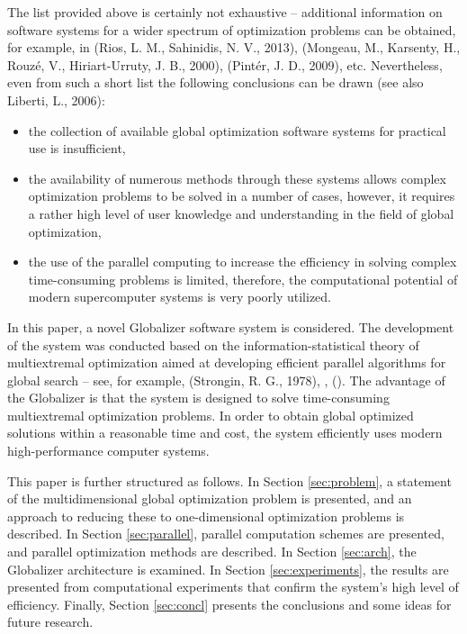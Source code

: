 \documentclass{gOMS2e}
\theoremstyle{plain}%
\theoremstyle{definition}
\theoremstyle{remark}
\begin{document}
\par
The list provided above is certainly not exhaustive – additional information on software
systems for a wider spectrum of optimization problems can be obtained, for example,
in (Rios, L. M., Sahinidis, N. V., 2013), (Mongeau, M.,  Karsenty, H., Rouzé, V., Hiriart-Urruty, J. B., 2000), (Pintér, J. D., 2009), etc.
Nevertheless, even from such a short list the following conclusions can be drawn (see also Liberti, L., 2006):
\begin{itemize}
\item  the collection of available global optimization software systems for practical use is insufficient,
\item the availability of numerous methods through these systems allows complex
optimization problems to be solved in a number of cases, however, it requires a rather
high level of user knowledge and understanding in the field of global optimization,
\item the use of the parallel computing to increase the efficiency in solving complex
time-consuming problems is limited, therefore, the computational potential of modern
supercomputer systems is very poorly utilized.
\end{itemize}
\par
In this paper, a novel Globalizer software system is considered. The development of the
system was conducted based on the information-statistical theory of multiextremal
optimization aimed at developing efficient parallel algorithms for global search – see, for example, (Strongin, R. G., 1978), \cite{strSergGO}, (\cite{stronginGergelBarkalovParGO}).
The advantage of the Globalizer is that the system is designed to solve time-consuming
multiextremal optimization problems. In order to obtain global optimized solutions
within a reasonable time and cost, the system efficiently uses modern high-performance computer systems.
\par
This paper is further structured as follows. In Section \ref{sec:problem}, a statement of the multidimensional
global optimization problem is presented, and an approach to reducing these to one-dimensional
optimization problems is described. In Section \ref{sec:parallel}, parallel computation schemes are presented,
and parallel optimization methods are described. In Section \ref{sec:arch}, the Globalizer architecture
is examined. In Section \ref{sec:experiments}, the results are presented from computational experiments
that confirm the system’s high level of efficiency. Finally, Section \ref{sec:concl} presents the
conclusions and some ideas for future research.
\end{document}
